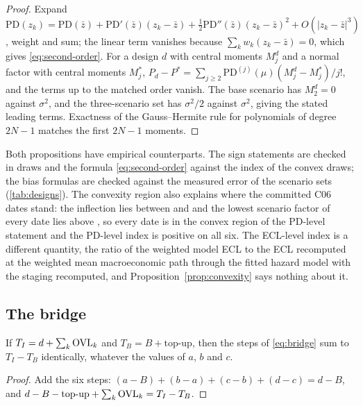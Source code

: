 \begin{proof}
Expand $\mathrm{PD}(z_k)=\mathrm{PD}(\bar z)+\mathrm{PD}'(\bar z)(z_k-\bar z)+\tfrac12\mathrm{PD}''(\bar z)(z_k-\bar z)^{2}+O(|z_k-\bar z|^{3})$, weight and sum; the linear term vanishes because $\sum_kw_k(z_k-\bar z)=0$, which gives \eqref{eq:second-order}. For a design $d$ with central moments $M^{d}_j$ and a normal factor with central moments $M^{*}_j$, $P_d-P^{*}=\sum_{j\ge2}\mathrm{PD}^{(j)}(\mu)(M^{d}_j-M^{*}_j)/j!$, and the terms up to the matched order vanish. The base scenario has $M^{d}_2=0$ against $\sigma^{2}$, and the three-scenario set has $\sigma^{2}/2$ against $\sigma^{2}$, giving the stated leading terms. Exactness of the Gauss--Hermite rule for polynomials of degree $2N-1$ matches the first $2N-1$ moments.
\end{proof}

Both propositions have empirical counterparts.
The sign statements are checked in \efourDraws{} draws and the formula \eqref{eq:second-order} against the index of the convex draws; the bias formulas are checked against the measured error of the scenario sets (\cref{tab:designs}).
The convexity region also explains where the committed C06 dates stand: the inflection lies between \efourZstarLow{} and \efourZstarHigh{} and the lowest scenario factor of every date lies above \efourZminLow{}, so every date is in the convex region of the PD-level statement and the PD-level index is positive on all six.
The ECL-level index is a different quantity, the ratio of the weighted model ECL to the ECL recomputed at the weighted mean macroeconomic path through the fitted hazard model with the staging recomputed, and Proposition~\ref{prop:convexity} says nothing about it.

\subsection{The bridge}
\label{sec:theory-bridge}

\begin{proposition}
\label{prop:bridge}
If $T_I=d+\sum_k\mathrm{OVL}_k$ and $T_B=B+\text{top-up}$, then the steps of \eqref{eq:bridge} sum to $T_I-T_B$ identically, whatever the values of $a$, $b$ and $c$.
\end{proposition}

\begin{proof}
Add the six steps: $(a-B)+(b-a)+(c-b)+(d-c)=d-B$, and $d-B-\text{top-up}+\sum_k\mathrm{OVL}_k=T_I-T_B$.
\end{proof}

